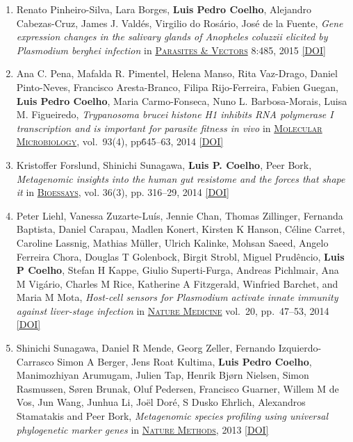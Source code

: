\documentclass{article}
\newcommand\showdoi[1]{%
    \href{http://dx.doi.org/#1}{[DOI]}%
}
\newcommand\pubname[1]{\textsc{\uline{#1}}}
\newcommand\contribution[1]{\relax}
\begin{document}
\begin{enumerate}[resume]
\item Renato Pinheiro-Silva, Lara Borges, \textbf{Luis Pedro Coelho}, Alejandro
Cabezas-Cruz, James J. Valdés, Virgilio do Rosário, José de la Fuente,
\emph{Gene expression changes in the salivary glands of Anopheles coluzzii
elicited by Plasmodium berghei infection} in \pubname{Parasites \& Vectors}
8:485, 2015 \showdoi{10.1186/s13071-015-1079-8}
\contribution{I supervised the first-author, who was, at the time a PhD
student, in the statistical analysis of the RNA-seq data.}


\item Ana C. Pena, Mafalda R. Pimentel, Helena Manso, Rita Vaz-Drago, Daniel
Pinto-Neves, Francisco Aresta-Branco, Filipa Rijo-Ferreira, Fabien Guegan,
\textbf{Luis Pedro Coelho}, Maria Carmo-Fonseca, Nuno L. Barbosa-Morais, Luisa
M. Figueiredo, \emph{Trypanosoma brucei histone H1 inhibits RNA polymerase I
transcription and is important for parasite fitness in vivo} in
\pubname{Molecular Microbiology}, vol.\ 93(4), pp\. 645--63, 2014
\showdoi{10.1111/mmi.12677}
\contribution{I supervised D.P-N., who was at the time, a bioinformatics MSc
student, in the statistical analysis of the RNA-seq data.}

\item Kristoffer Forslund, Shinichi Sunagawa, \textbf{Luis P. Coelho}, Peer
Bork, \emph{Metagenomic insights into the human gut resistome and the forces that
shape it} in \pubname{Bioessays}, vol. 36(3), pp. 316--29, 2014
\showdoi{10.1002/bies.201300143}
\contribution{I performed data analysis.}

\item Peter Liehl, Vanessa Zuzarte-Luís, Jennie Chan, Thomas Zillinger,
Fernanda Baptista, Daniel Carapau, Madlen Konert, Kirsten K Hanson, Céline
Carret, Caroline Lassnig, Mathias Müller, Ulrich Kalinke, Mohsan Saeed,
Angelo Ferreira Chora, Douglas T Golenbock, Birgit Strobl, Miguel Prudêncio,
\textbf{Luis P Coelho}, Stefan H Kappe, Giulio Superti-Furga, Andreas
Pichlmair, Ana M Vigário, Charles M Rice, Katherine A Fitzgerald, Winfried
Barchet, and Maria M Mota, \emph{Host-cell sensors for Plasmodium activate
innate immunity against liver-stage infection} in \pubname{Nature Medicine}
vol.\ 20, pp.\ 47--53, 2014 \showdoi{10.1038/nm.3424}
\contribution{I performed statistical analysis of the gene expression data.}

\item Shinichi Sunagawa, Daniel R Mende, Georg Zeller, Fernando
Izquierdo-Carrasco Simon A Berger, Jens Roat Kultima, \textbf{Luis Pedro
Coelho}, Manimozhiyan Arumugam, Julien Tap, Henrik Bjørn Nielsen, Simon
Rasmussen, Søren Brunak, Oluf Pedersen, Francisco Guarner, Willem M de Vos,
Jun Wang, Junhua Li, Joël Doré, S Dusko Ehrlich, Alexandros Stamatakis and
Peer Bork, \emph{Metagenomic species profiling using universal phylogenetic
marker genes} in \pubname{Nature Methods}, 2013 \showdoi{10.1038/nmeth.2693}
\contribution{I implemented the stand-alone version of the published metagenomics tool.}


\end{enumerate}
\end{document}
